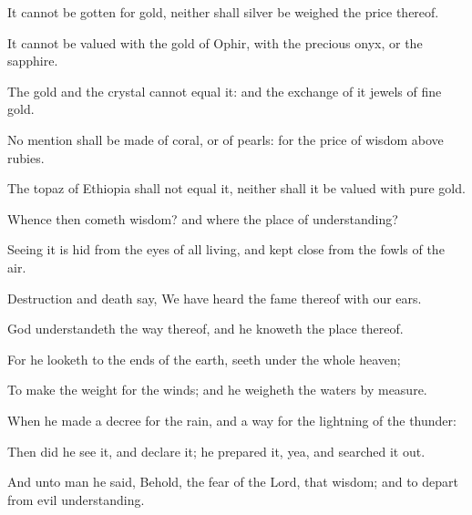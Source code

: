 {It cannot be
gotten for
gold, neither shall
silver be
weighed
{} the
price thereof.

It cannot be
valued with the
gold of
Ophir, with the
precious
onyx, or the
sapphire.

The
gold and the
crystal cannot
equal it: and the
exchange of it
{}
jewels of fine
gold.

No
mention shall be made of
coral, or of
pearls: for the
price of
wisdom
{} above
rubies.

The
topaz of
Ethiopia shall not
equal it, neither shall it be
valued with
pure
gold.


\par }{\PP {}Whence then
cometh
wisdom? and where
{} the
place of
understanding?

Seeing it is
hid from the
eyes of all
living, and kept
close from the
fowls of the
air.

Destruction and
death
say, We have
heard the
fame thereof with our
ears.

God
understandeth the
way thereof, and he
knoweth the
place thereof.

For he
looketh to the
ends of the
earth,
{}
seeth under the whole
heaven;

To
make the
weight for the
winds; and he
weigheth the
waters by
measure.

When he
made a
decree for the
rain, and a
way for the
lightning of the
thunder:

Then did he
see it, and
declare it; he
prepared it, yea, and searched it
out.

And unto
man he
said, Behold, the
fear of the
Lord, that
{}
wisdom; and to
depart from
evil
{}
understanding.




\par }
